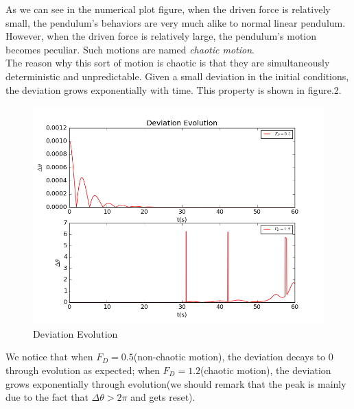 \documentclass[10pt,a4paper]{article}
\begin{document}
    As we can see in the numerical plot figure, when the driven force is relatively small, the pendulum's behaviors are very much alike to normal linear pendulum. However, when the driven force is relatively large, the pendulum's motion becomes peculiar. Such motions are named \emph{chaotic motion}.\\
    The reason why this sort of motion is chaotic is that they are simultaneously deterministic and unpredictable. Given a small deviation in the initial conditions, the deviation grows exponentially with time. This property is shown in figure.2.
    \begin{figure}[htbp]
    	\centering
    	\includegraphics[width=5in]{chaotic_pend3.png}
    	\caption{Deviation Evolution}
    \end{figure}
    We notice that when $F_D=0.5$(non-chaotic motion), the deviation decays to $0$ through evolution as expected; when $F_D=1.2$(chaotic motion), the deviation grows exponentially through evolution(we should remark that the peak is mainly due to the fact that $\Delta \theta>2\pi$ and gets reset).
\end{document}
